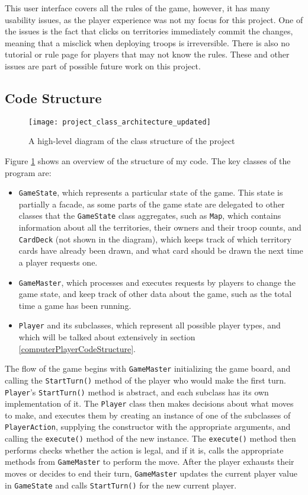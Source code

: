 This user interface covers all the rules of the game, however, it has many usability issues, as the player experience was not my focus for this project. One of the issues is the fact that clicks on territories immediately commit the changes, meaning that a misclick when deploying troops is irreversible. There is also no tutorial or rule page for players that may not know the rules. These and other issues are part of possible future work on this project.

\subsection{Code Structure}
\label{codeStructure}
\begin{figure}[H]
\texttt{[image: project\_class\_architecture\_updated]}
\caption{A high-level diagram of the class structure of the project}
\label{fig:UMLDiagram}
\end{figure}

Figure \ref{fig:UMLDiagram} shows an overview of the structure of my code. The key classes of the program are:
\begin{itemize}
\item \texttt{GameState}, which represents a particular state of the game. This state is partially a facade, as some parts of the game state are delegated to other classes that the \texttt{GameState} class aggregates, such as \texttt{Map}, which contains information about all the territories, their owners and their troop counts, and \texttt{CardDeck} (not shown in the diagram), which keeps track of which territory cards have already been drawn, and what card should be drawn the next time a player requests one.
\item \texttt{GameMaster}, which processes and executes requests by players to change the game state, and keep track of other data about the game, such as the total time a game has been running.
\item \texttt{Player} and its subclasses, which represent all possible player types, and which will be talked about extensively in section \ref{computerPlayerCodeStructure}.
\end{itemize}

The flow of the game begins with \texttt{GameMaster} initializing the game board, and calling the \texttt{StartTurn()} method of the player who would make the first turn. \texttt{Player}'s \texttt{StartTurn()} method is abstract, and each subclass has its own implementation of it. The \texttt{Player} class then makes decisions about what moves to make, and executes them by creating an instance of one of the subclasses of \texttt{PlayerAction}, supplying the constructor with the appropriate arguments, and calling the \texttt{execute()} method of the new instance. The \texttt{execute()} method then performs checks whether the action is legal, and if it is, calls the appropriate methods from \texttt{GameMaster} to perform the move. After the player exhausts their moves or decides to end their turn, \texttt{GameMaster} updates the current player value in \texttt{GameState} and calls \texttt{StartTurn()} for the new current player.

